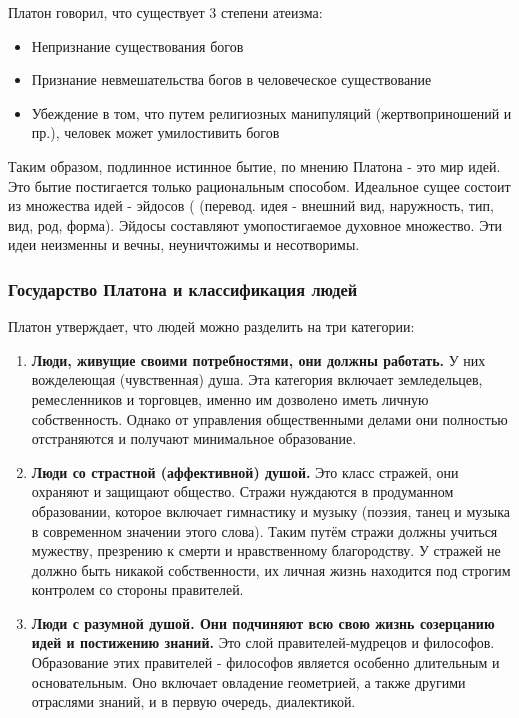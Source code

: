 \documentclass[a4paper, 14pt]{extreport}
\begin{document}
Платон говорил, что существует 3 степени атеизма:

\begin{itemize}

\item
  Непризнание существования богов
\item
  Признание невмешательства богов в человеческое существование
\item
  Убеждение в том, что путем религиозных манипуляций (жертвоприношений и
  пр.), человек может умилостивить богов
\end{itemize}

Таким образом, подлинное истинное бытие, по мнению Платона - это мир
идей. Это бытие постигается только рациональным способом. Идеальное
сущее состоит из множества идей - эйдосов ( (перевод. идея - внешний
вид, наружность, тип, вид, род, форма). Эйдосы составляют умопостигаемое
духовное множество. Эти идеи неизменны и вечны, неуничтожимы и
несотворимы.

\subsubsection{Государство Платона и классификация людей}

Платон утверждает, что людей можно разделить на три категории:

\begin{enumerate}
\def\labelenumi{\arabic{enumi}.}
\item
  \textbf{Люди, живущие своими потребностями, они должны работать.} У
  них вожделеющая (чувственная) душа. Эта категория включает
  земледельцев, ремесленников и торговцев, именно им дозволено иметь
  личную собственность. Однако от управления общественными делами они
  полностью отстраняются и получают минимальное образование.
\item
  \textbf{Люди со страстной (аффективной) душой.} Это класс стражей, они
  охраняют и защищают общество. Стражи нуждаются в продуманном
  образовании, которое включает гимнастику и музыку (поэзия, танец и
  музыка в современном значении этого слова). Таким путём стражи должны
  учиться мужеству, презрению к смерти и нравственному благородству. У
  стражей не должно быть никакой собственности, их личная жизнь
  находится под строгим контролем со стороны правителей.
\item
  \textbf{Люди с разумной душой. Они подчиняют всю свою жизнь созерцанию
  идей и постижению знаний.} Это слой правителей-мудрецов и философов.
  Образование этих правителей - философов является особенно длительным и
  основательным. Оно включает овладение геометрией, а также другими
  отраслями знаний, и в первую очередь, диалектикой.
\end{enumerate}
\end{document}
